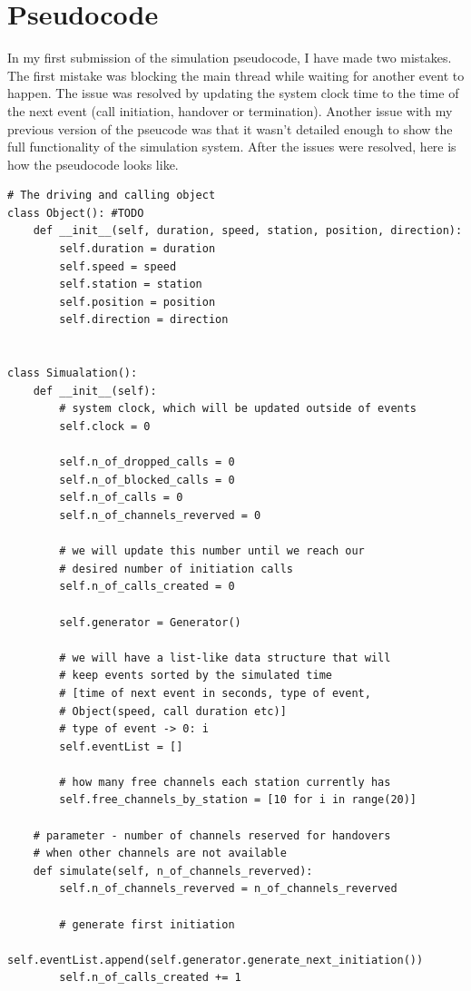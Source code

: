 \documentclass[12pt,a4paper]{article}
\begin{document}
\section{Pseudocode}
In my first submission of the simulation pseudocode, I have made two mistakes. The first mistake was blocking the main thread while waiting for another event to happen. The issue was resolved by updating the system clock time to the time of the next event (call initiation, handover or termination). Another issue with my previous version of the pseucode was that it wasn't detailed enough to show the full functionality of the simulation system. After the issues were resolved, here is how the pseudocode looks like.
\begin{lstlisting}
# The driving and calling object
class Object(): #TODO
    def __init__(self, duration, speed, station, position, direction):
        self.duration = duration
        self.speed = speed
        self.station = station
        self.position = position
        self.direction = direction


class Simualation():
    def __init__(self):
        # system clock, which will be updated outside of events
        self.clock = 0 

        self.n_of_dropped_calls = 0
        self.n_of_blocked_calls = 0
        self.n_of_calls = 0
        self.n_of_channels_reverved = 0

        # we will update this number until we reach our 
        # desired number of initiation calls
        self.n_of_calls_created = 0 

        self.generator = Generator()

        # we will have a list-like data structure that will 
        # keep events sorted by the simulated time
        # [time of next event in seconds, type of event, 
        # Object(speed, call duration etc)]
        # type of event -> 0: i
        self.eventList = []

        # how many free channels each station currently has
        self.free_channels_by_station = [10 for i in range(20)] 

    # parameter - number of channels reserved for handovers 
    # when other channels are not available
    def simulate(self, n_of_channels_reverved):
        self.n_of_channels_reverved = n_of_channels_reverved
        
        # generate first initiation
        self.eventList.append(self.generator.generate_next_initiation()) 
        self.n_of_calls_created += 1


\end{lstlisting}
\end{document}
